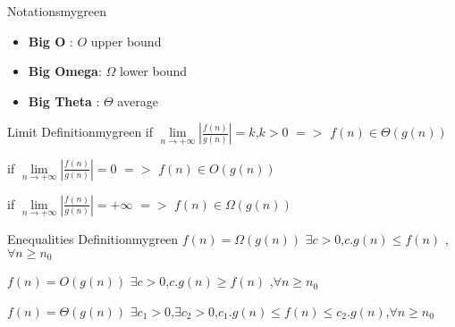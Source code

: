 
\vspace{0.5cm}
\begin{prettyBox}{Notations}{mygreen}
\begin{itemize}
    \item \textbf{Big O} : \(O\) upper bound
    \item \textbf{Big Omega}: \(\Omega\) lower bound 
    \item \textbf{Big Theta} : \(\Theta\) average
\end{itemize}
\end{prettyBox}

\vspace{0.5cm}

\begin{prettyBox}{Limit Definition}{mygreen}
    if \quad\(\lim\limits_{n \to +\infty}\left| \frac{f(n)}{g(n)}\right| =\)\hspace{0.15cm}\(k\)\quad,\quad\( k > \)0  \quad \(=> \) \quad \(f(n) \in \Theta (g(n))\)

    \vspace{0.25cm}
    if \quad\(\lim\limits_{n \to +\infty}\left| \frac{f(n)}{g(n)}\right| =\)\hspace{0.15cm}\(0\) \hspace{1.45cm} \quad \(=> \) \quad \(f(n) \in O (g(n))\)
    
    \vspace{0.25cm}
    if \quad\(\lim\limits_{n \to +\infty}\left| \frac{f(n)}{g(n)}\right| =\)\hspace{0.15cm}\(+\infty\) \hspace{1cm} \quad \(=> \) \quad \(f(n) \in \Omega (g(n))\)
\end{prettyBox}


\vspace{0.5cm}

\begin{prettyBox}{Enequalities Definition}{mygreen}
    \(f(n) = \Omega(g(n))\) \quad \( \exists c > 0\)\hspace{0.1cm},\quad \(c . g(n) \leq f(n)\) \quad ,\hspace{0.1cm}\(\forall n \geq n_0\)


\vspace{0.15cm}
\(f(n) = O(g(n))\) \quad \(\exists c > 0\)\hspace{0.1cm},\quad\(c . g(n) \geq f(n)\) \quad ,\hspace{0.1cm}\(\forall n \geq n_0\)

\vspace{0.15cm}
\(f(n) = \Theta(g(n))\) \quad \(\exists c_1 > 0\)\hspace{0.1cm},\hspace{0.1cm}\(\exists c_2 > 0\)\hspace{0.1cm},\quad \(c_1 . g(n) \leq f(n) \leq c_2. g(n)\)\quad  ,\hspace{0.1cm}\(\forall n \geq n_0\)

\end{prettyBox}

